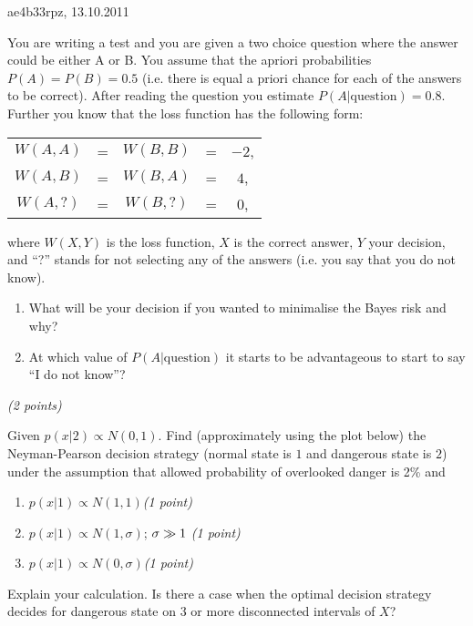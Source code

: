 \documentclass[a4paper,12pt]{article}
\begin{document}
  \pagestyle{empty}
   \hfill ae4b33rpz, 13.10.2011\newline
  \noindent\hspace*{0.01cm}\hrulefill\newline\newline
  \newline

  You are writing a test and you are given a two choice question where
  the answer could be either A or B. You assume that the apriori probabilities $P(A) =
  P(B) = 0.5$ (i.e. there is equal a priori chance for each of the answers
  to be correct). After reading the question you estimate
  $P(A|\mbox{question}) = 0.8$. Further you know that the loss function
  has the following form:\newline

 \begin{tabular}{ccccc}
    $W(A, A)$ & = & $W(B, B)$ & = & $-2$,\\
    $W(A, B)$ & = & $W(B, A)$ & = & $4$,\\
    $W(A, ?)$ & = & $W(B, ?)$ & = & $0$,
  \end{tabular}\newline

  where $W(X, Y)$ is the loss function, $X$ is the correct answer, 
  $Y$ your decision, and ``?'' stands for not selecting any of the
  answers (i.e. you say that you do not know).

  \begin{enumerate}
    \item What will be your decision if you wanted to minimalise the
      Bayes risk and why?
    \item At which value of $P(A|\mbox{question})$ it starts to be
      advantageous to start to say ``I do not know''?
  \end{enumerate}

  \hfill {\it (2 points)}

  \vspace*{1em}

   \newline

  Given $p(x|2) \propto N(0,1)$. Find (approximately using the plot below) the Neyman-Pearson decision strategy (normal state is $1$ and dangerous state is $2$) under the assumption that allowed probability of overlooked danger is 2\% and
  \begin{enumerate}
    \item $p(x|1) \propto N(1,1)$\hfill {\it (1 point)}
    \item $p(x|1) \propto N(1,\sigma)$; $\sigma \gg 1\hfill$ {\it (1 point)}
    \item $p(x|1) \propto N(0,\sigma)$\hfill {\it (1 point)}
  \end{enumerate}
  Explain your calculation. Is there a case when the optimal decision strategy decides for dangerous state on 3 or more disconnected intervals of $X$?
\end{document}
